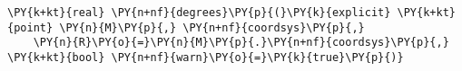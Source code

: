\begin{Verbatim}[commandchars=\\\{\}]
    \PY{k+kt}{real} \PY{n+nf}{degrees}\PY{p}{(}\PY{k}{explicit} \PY{k+kt}{point} \PY{n}{M}\PY{p}{,} \PY{n+nf}{coordsys}\PY{p}{,}
    \PY{n}{R}\PY{o}{=}\PY{n}{M}\PY{p}{.}\PY{n+nf}{coordsys}\PY{p}{,} \PY{k+kt}{bool} \PY{n+nf}{warn}\PY{o}{=}\PY{k}{true}\PY{p}{)}
\end{Verbatim}
